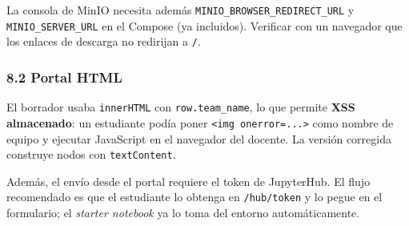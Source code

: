 \documentclass[11pt,a4paper]{article}
\begin{document}
La consola de MinIO necesita además \texttt{MINIO\_\allowbreak{}BROWSER\_\allowbreak{}REDIRECT\_\allowbreak{}URL} y \texttt{MINIO\_\allowbreak{}SERVER\_\allowbreak{}URL} en el Compose (ya incluidos). Verificar con un navegador que los enlaces de descarga no redirijan a \texttt{/\allowbreak{}}.

\hypertarget{82-portal-html}{%
\subsubsection{8.2 Portal HTML}\label{82-portal-html}}

El borrador usaba \texttt{innerHTML} con \texttt{row.\allowbreak{}team\_\allowbreak{}name}, lo que permite \textbf{XSS almacenado}: un estudiante podía poner \texttt{\textless{}img\ onerror=...\textgreater{}} como nombre de equipo y ejecutar JavaScript en el navegador del docente. La versión corregida construye nodos con \texttt{textContent}.

Además, el envío desde el portal requiere el token de JupyterHub. El flujo recomendado es que el estudiante lo obtenga en \texttt{/\allowbreak{}hub/\allowbreak{}token} y lo pegue en el formulario; el \emph{starter notebook} ya lo toma del entorno automáticamente.
\end{document}
